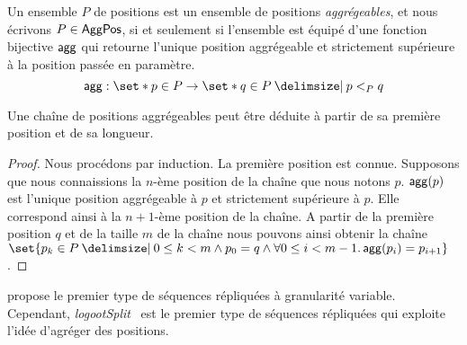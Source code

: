 \begin{definition}\label{def:offest-positions}
Un ensemble $P$ de positions est un ensemble de positions \emph{aggrégeables}, et nous écrivons $P \in \operatorname{\mathsf{AggPos}}$, si et seulement si l'ensemble est équipé d'une fonction bijective $\operatorname{\mathsf{agg}}$ qui retourne l'unique position aggrégeable et strictement supérieure à la position passée en paramètre.
\begin{equation*}
    \trm{agg}: \set*{p \in P} \to \set*{q \in P \given p <_P q}
\end{equation*}
\end{definition}

\begin{theorem}
Une chaîne de positions aggrégeables peut être déduite à partir de sa première position et de sa longueur.
\end{theorem}

\begin{proof}
Nous procédons par induction. La première position est connue. Supposons que nous connaissions la $n$-ème position de la chaîne que nous notons $p$.
$\operatorname{\mathsf{agg}}(p)$ est l'unique position aggrégeable à $p$ et strictement supérieure à $p$.
Elle correspond ainsi à la $n+1$-ème position de la chaîne.
A partir de la première position $q$ et de la taille $m$ de la chaîne nous pouvons ainsi obtenir la chaîne $\set{p_k \in P \given 0 \leq k < m \land p_0 = q \land \forall 0 \leq i < m-1 \qsep \trm{agg}(p_i) = p_{i+1}}$.
\end{proof}

\textcite{yu_2012_string-wise-crdt} propose le premier type de séquences répliquées à granularité variable.
Cependant, \emph{logootSplit}~\cite{andre_2013_logootsplit} est le premier type de séquences répliquées qui exploite l'idée d'agréger des positions.

